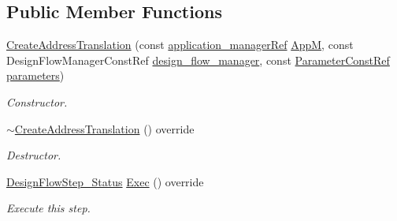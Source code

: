 \subsection*{Public Member Functions}
\begin{DoxyCompactItemize}
\item 
\hyperlink{classCreateAddressTranslation_a15b94b6810b67ea5d972a8bd4a4e2827}{Create\+Address\+Translation} (const \hyperlink{application__manager_8hpp_a04ccad4e5ee401e8934306672082c180}{application\+\_\+manager\+Ref} \hyperlink{classFrontendFlowStep_a0ac0d8db2a378416583f51c4faa59d15}{AppM}, const Design\+Flow\+Manager\+Const\+Ref \hyperlink{classDesignFlowStep_ab770677ddf087613add30024e16a5554}{design\+\_\+flow\+\_\+manager}, const \hyperlink{Parameter_8hpp_a37841774a6fcb479b597fdf8955eb4ea}{Parameter\+Const\+Ref} \hyperlink{classDesignFlowStep_a802eaafe8013df706370679d1a436949}{parameters})
\begin{DoxyCompactList}\small\item\em Constructor. \end{DoxyCompactList}\item 
\hyperlink{classCreateAddressTranslation_ab1a2d19591190aa85668b851f12f103c}{$\sim$\+Create\+Address\+Translation} () override
\begin{DoxyCompactList}\small\item\em Destructor. \end{DoxyCompactList}\item 
\hyperlink{design__flow__step_8hpp_afb1f0d73069c26076b8d31dbc8ebecdf}{Design\+Flow\+Step\+\_\+\+Status} \hyperlink{classCreateAddressTranslation_a1213d1228ac3e336e8425ebacdf1ab60}{Exec} () override
\begin{DoxyCompactList}\small\item\em Execute this step. \end{DoxyCompactList}\end{DoxyCompactItemize}
